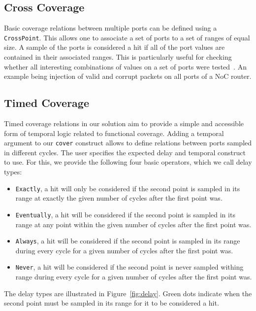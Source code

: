 \documentclass[conference]{IEEEtran}
\begin{document}
\subsection{Cross Coverage}
Basic coverage relations between multiple ports can be defined using a \texttt{CrossPoint}. 
This allows one to associate a set of ports to a set of ranges of equal size.  
A sample of the ports is considered a hit if all of the port values are contained in their associated ranges. This is particularly useful for checking whether all interesting combinations of values on a set of ports were tested~\cite{hdlverify}. An example being injection of valid and corrupt packets on all ports of a NoC router. %

\subsection{Timed Coverage}
Timed coverage relations in our solution aim to provide a simple and accessible form of temporal logic related to functional coverage. Adding a temporal argument to our \texttt{cover} construct allows to define relations between ports sampled in different cycles. The user specifies the expected delay and temporal construct to use. For this, we provide the following four basic operators, which we call delay types:%
\begin{itemize}
 \item \texttt{Exactly}, a hit will only be considered if the second point is sampled in its range at exactly the given number of cycles after the first point was.
 \item \texttt{Eventually}, a hit will be considered if the second point is sampled in its range at any point within the given number of cycles after the first point was.  
 \item \texttt{Always}, a hit will be considered if the second point is sampled in its range during every cycle for a given number of cycles after the first point was.
 \item \texttt{Never}, a hit will be considered if the second point is never sampled withing range during every cycle for a given number of cycles after the first point was.
\end{itemize}  
The delay types are illustrated in Figure~\ref{fig:delay}. Green dots indicate when the second point must be sampled in its range for it to be considered a hit. %
\end{document}
